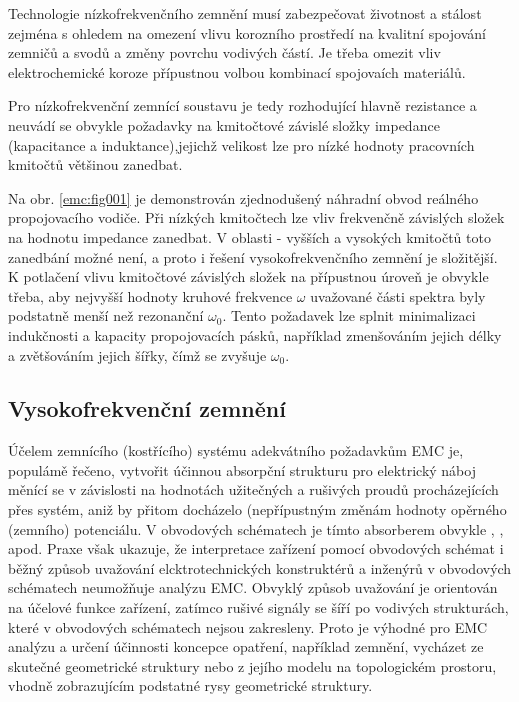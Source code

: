       Technologie nízkofrekvenčního zemnění musí zabezpečovat životnost a stálost zejména s ohledem
      na omezení vlivu korozního prostředí na kvalitní spojování zemničů a svodů a změny povrchu
      vodivých částí. Je třeba omezit vliv elektrochemické koroze přípustnou volbou kombinací
      spojovaích materiálů. 

      Pro nízkofrekvenční zemnící soustavu je tedy rozhodující hlavně rezistance a neuvádí se
      obvykle požadavky na kmitočtové závislé složky impedance (kapacitance a induktance),jejichž
      velikost lze pro nízké hodnoty pracovních kmitočtů většinou zanedbat. 

      Na obr. \ref{emc:fig001} je demonstrován zjednodušený náhradní obvod reálného propojovacího
      vodiče. Při nízkých kmitočtech lze vliv frekvenčně závislých složek na hodnotu impedance
      zanedbat. V oblasti - vyšších a vysokých kmitočtů toto zanedbání možné není, a proto i řešení
      vysokofrekvenčního zemnění je složitější. K potlačení vlivu kmitočtové závislých složek na
      přípustnou úroveň je obvykle třeba, aby nejvyšší hodnoty kruhové frekvence \(\omega\)
      uvažované části spektra byly podstatně menší než rezonanční \(\omega_0\). Tento požadavek lze
      splnit minimalizaci indukčnosti a kapacity propojovacích pásků, například zmenšováním jejich
      délky a zvětšováním jejich šířky, čímž se zvyšuje \(\omega_0\).

    \subsection{Vysokofrekvenční zemnění}\label{emc:IchapIIIsecIssecII}
      
      Účelem zemnícího (kostřícího) systému adekvátního požadavkům EMC je, populámě řečeno, vytvořit
      účinnou absorpční strukturu pro elektrický náboj měnící se v závislosti na hodnotách
      užitečných a rušivých proudů procházejících přes systém, aniž by přitom docházelo
      (nepřípustným změnám hodnoty opěrného (zemního) potenciálu. V obvodových schématech je tímto
      absorberem obvykle \emph{}, \emph{}, \emph{} apod.
      Praxe však ukazuje, že interpretace zařízení pomocí obvodových schémat i běžný způsob
      uvažování elcktrotechnických konstruktérů a inženýrů v obvodových schématech neumožňuje
      analýzu EMC. Obvyklý způsob uvažování je orientován na účelové funkce zařízení, zatímco rušivé
      signály se šíří po vodivých strukturách, které v obvodových schématech nejsou zakresleny.
      Proto je výhodné pro EMC analýzu a určení účinnosti koncepce opatření, například zemnění,
      vycházet ze skutečné geometrické struktury nebo z jejího modelu na topologickém prostoru,
      vhodně zobrazujícím podstatné rysy geometrické struktury. 
      
